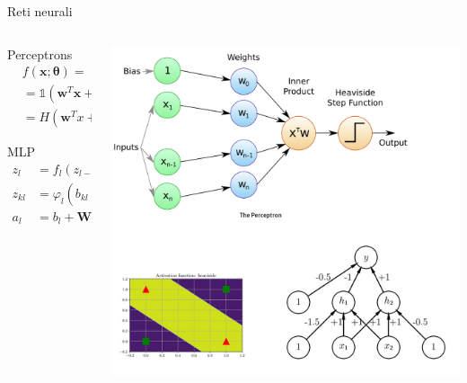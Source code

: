 \documentclass[11pt]{beamer}
\begin{document}
\begin{frame}{Reti neurali \cite{pml1Book,pml2Book}}
\begin{columns}
\begin{column}{0.5\textwidth}
\begin{alertblock}{Perceptrons}
\begin{equation*}
\begin{split}
&f(\textbf{x};\bm{\theta})=\\
&=\mathds{1}(\textbf{w}^{T}\textbf{x}+b \geq 0)\\
&=H(\textbf{w}^{T}x+b)
\end{split}
\end{equation*}
\end{alertblock}
\begin{alertblock}{MLP}
\begin{equation*}
\begin{split}
z_{l}& =f_{l}(z_{l-1})=\varphi(\textbf{b}_l+\textbf{W}_{l}z_{l-1}) \\
z_{kl}& =\varphi_{l}\left(b_{kl}+\sum^{K_{l-1}}_{j=1}w_{lkj}z_{jl-1}\right) \\
a_{l}& =b_{l}+\textbf{W}_{l}\textbf{z}_{l-1}
\end{split}
\end{equation*}
\end{alertblock}
\end{column}
\begin{column}{0.4\textwidth}  
\begin{center}
\includegraphics[width=\textwidth]{Pic/perceptron.png}
\end{center}
\end{column}
\end{columns}
\end{frame}
\end{document}
